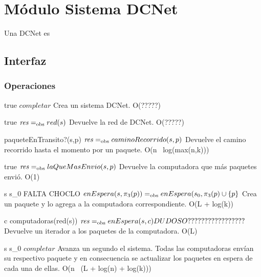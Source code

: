 

\section{Módulo Sistema DCNet}

Una DCNet es

\subsection{Interfaz}



\subsubsection*{Operaciones}


 {true}
 {$completar$}
 {Crea un sistema DCNet.}
 {O(?????)}

 {true}
 {$\text{\textit{res}} =_{\mathrm{obs}} red(s)$}
 {Devuelve la red de DCNet.}
 {O(?????)}

 {paqueteEnTransito?(s,p)}
 {$\text{\textit{res}} =_{\mathrm{obs}} caminoRecorrido(s,p)$}
 {Devuelve el camino recorrido hasta el momento por un paquete.}
 {O(n \times\  log(max(n,k)))}

 {true}
 {$\text{\textit{res}} =_{\mathrm{obs}} laQueMasEnvio(s,p)$}
 {Devuelve la computadora que más paquetes envió.}
 {O(1)}

 {s \igobs s_0 \land FALTA CHOCLO}
 {$enEspera(s,\pi_3(p)) =_{\mathrm{obs}} enEspera(s_0,\pi_3(p) \cup \{p\}$}
 {Crea un paquete y lo agrega a la computadora correspondiente.}
 {O(L + log(k))}

 {c \in computadoras(red(s))}
 {$\text{\textit{res}} =_{\mathrm{obs}} enEspera(s,c) DUDOSO?????????????????$}
 {Devuelve un iterador a los paquetes de la computadora.}
 {O(L)}

 {s \igobs s_0}
 {$completar$}
 {Avanza un segundo el sistema. Todas las computadoras envían su respectivo paquete y en consecuencia se actualizar los paquetes en espera de cada una de ellas.}
 {O(n \times\ (L + log(n) + log(k)))}

